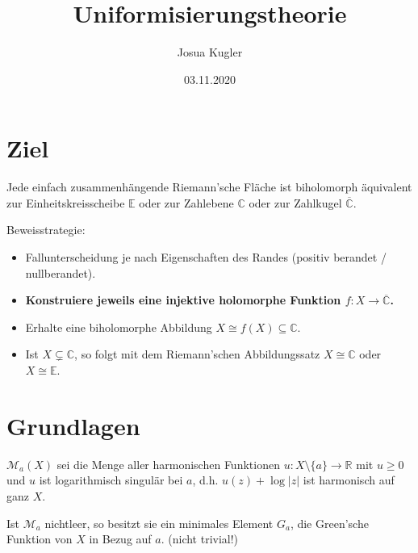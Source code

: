 \documentclass{beamer}
\title{Uniformisierungstheorie}
\author{Josua Kugler}
\date{03.11.2020}
\newcommand{\R}{\mathbb{R}}
\newcommand{\C}{\mathbb{C}}
\newcommand{\E}{\mathbb{E}}
\begin{document}
\titlepage
\section{Ziel}
    \begin{frame}
        \begin{theorem}[Uniformisierungssatz]
            Jede einfach zusammenhängende Riemann'sche Fläche ist biholomorph äquivalent zur Einheitskreisscheibe $\E$ oder zur Zahlebene $\C$ oder zur Zahlkugel $\overline{\C}$.
        \end{theorem}
    \end{frame}
    \begin{frame}
        Beweisstrategie: 
        \begin{itemize}
            \item Fallunterscheidung je nach Eigenschaften des Randes (positiv berandet / nullberandet).
            \item \textbf{Konstruiere jeweils eine injektive holomorphe Funktion $f\colon X \to \overline{\C}$.}
            \item Erhalte eine biholomorphe Abbildung $X \cong f(X) \subseteq \C$. 
            \item Ist $X \subsetneq \C$, so folgt mit dem Riemann'schen Abbildungssatz $X \cong \C$ oder $X\cong \E$.
        \end{itemize}
    \end{frame}
    \section{Grundlagen}
    \begin{frame}
        $\mathcal{M}_a(X)$ sei die Menge aller harmonischen Funktionen $u \colon X \setminus \{a\} \to \R$ mit $u \geq 0$ und $u$ ist logarithmisch singulär bei $a$, d.h.
        $u(z) + \log |z|$ ist harmonisch auf ganz $X$.
        \begin{definition}
            Ist $\mathcal{M}_a$ nichtleer, so besitzt sie ein minimales Element $G_a$, die Green'sche Funktion von $X$ in Bezug auf $a$. (nicht trivial!)
        \end{definition}
    \end{frame}
    
    
    
\end{document}
